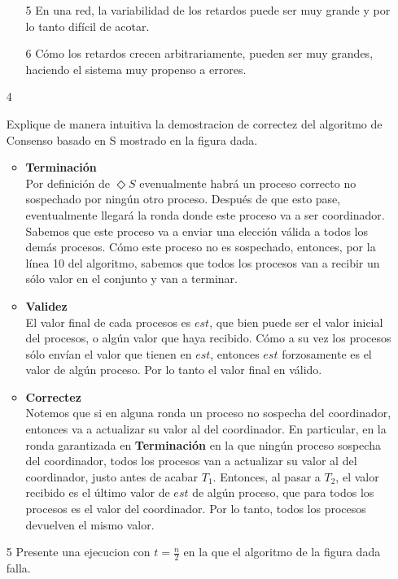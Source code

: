 \documentclass[12pt,a4paper]{report}
\begin{document}
\begin{itemize}
{\begin{itemize}
        \item[5]{En una red, la variabilidad de los retardos puede ser muy
            grande y por lo tanto difícil de acotar.}
        \item[6]{Cómo los retardos crecen arbitrariamente, pueden ser muy
            grandes, haciendo el sistema muy propenso a errores.}
    \end{itemize}
}
\item[4]{Explique de manera intuitiva la demostracion de correctez del
    algoritmo de Consenso basado en S mostrado en la figura dada.
    \begin{itemize}[label=$\circ$]
        \item{\textbf{Terminación}\\
            Por definición de $\Diamond S$ evenualmente habrá  un proceso correcto no sospechado por ningún otro proceso.
			Después de que esto pase, eventualmente llegará la ronda donde este
			proceso va a ser coordinador.
            Sabemos que este proceso va a enviar una elección válida a todos los
            demás procesos. Cómo este proceso no es sospechado, entonces, por
			la línea 10 del algoritmo, sabemos que todos los procesos van a
			recibir un sólo valor en el conjunto y van a terminar.
        }
        \item{\textbf{Validez}\\
			El valor final de cada procesos es $est$, que bien puede ser el
			valor inicial del procesos, o algún valor que haya recibido.
			Cómo a su vez los procesos sólo envían el valor que tienen en $est$,
			entonces $est$ forzosamente es el valor de algún proceso.
			Por lo tanto el valor final en válido.
		}
        \item{\textbf{Correctez}\\
			Notemos que si en alguna ronda un proceso no sospecha del coordinador,
			entonces va a actualizar su valor al del coordinador.
			En particular, en la ronda garantizada en \textbf{Terminación} en la
			que ningún proceso sospecha del coordinador, todos los procesos van
			a actualizar su valor al del coordinador, justo antes de acabar $T_1$.
			Entonces, al pasar a $T_2$, el valor recibido es el último valor de
			$est$ de algún proceso, que para todos los procesos es el valor del
			coordinador.
			Por lo tanto, todos los procesos devuelven el mismo valor.
		}
    \end{itemize}
}
\item[5]{Presente una ejecucion con $t=\tfrac{n}{2}$ en la que el algoritmo
    de la figura dada falla.\\
}
\end{itemize}
\end{document}
